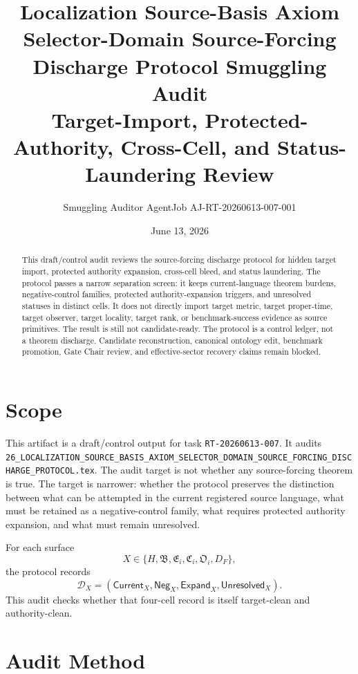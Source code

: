 \documentclass[11pt]{article}
\title{\textbf{Localization Source-Basis Axiom Selector-Domain Source-Forcing Discharge Protocol Smuggling Audit}\\[0.35em]
\large Target-Import, Protected-Authority, Cross-Cell, and Status-Laundering Review}
\author{Smuggling Auditor AgentJob AJ-RT-20260613-007-001}
\date{June 13, 2026}
\newcommand{\HorizonFam}{\mathfrak{B}}
\newcommand{\EnumFam}{\mathfrak{E}}
\newcommand{\CertFam}{\mathfrak{C}}
\newcommand{\OutFam}{\mathfrak{O}}
\newcommand{\Current}{\mathsf{Current}}
\newcommand{\Neg}{\mathsf{Neg}}
\newcommand{\Expand}{\mathsf{Expand}}
\newcommand{\Unres}{\mathsf{Unresolved}}
\begin{document}
\maketitle

\begin{abstract}
This draft/control audit reviews the source-forcing discharge protocol for
hidden target import, protected authority expansion, cross-cell bleed, and
status laundering. The protocol passes a narrow separation screen: it keeps
current-language theorem burdens, negative-control families, protected
authority-expansion triggers, and unresolved statuses in distinct cells. It
does not directly import target metric, target proper-time, target observer,
target locality, target rank, or benchmark-success evidence as source
primitives. The result is still not candidate-ready. The protocol is a
control ledger, not a theorem discharge. Candidate reconstruction, canonical
ontology edit, benchmark promotion, Gate Chair review, and effective-sector
recovery claims remain blocked.
\end{abstract}

\section{Scope}

This artifact is a draft/control output for task \texttt{RT-20260613-007}.
It audits
\texttt{26\_LOCALIZATION\_SOURCE\_BASIS\_AXIOM\_SELECTOR\_DOMAIN\_SOURCE\_FORCING\_DISCHARGE\_PROTOCOL.tex}.
The audit target is not whether any source-forcing theorem is true. The
target is narrower: whether the protocol preserves the distinction between
what can be attempted in the current registered source language, what must be
retained as a negative-control family, what requires protected authority
expansion, and what must remain unresolved.

For each surface
\[
X\in\{H,\HorizonFam,\EnumFam_i,\CertFam_i,\OutFam_i,D_F\},
\]
the protocol records
\[
\mathcal{D}_X=(\Current_X,\Neg_X,\Expand_X,\Unres_X).
\]
This audit checks whether that four-cell record is itself target-clean and
authority-clean.

\section{Audit Method}
\end{document}
